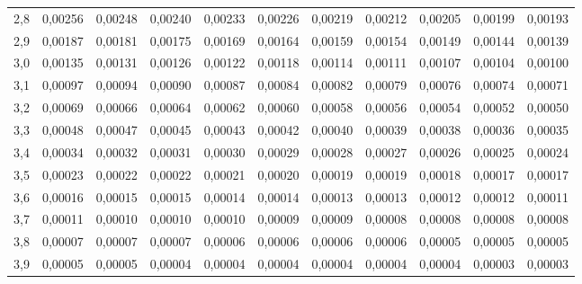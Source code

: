 \documentclass[a4paper]{article}
\begin{document}
\begin{center}
{\begin{tabular}{rrrrrrrrrrr}
  2,8 & 0,00256 & 0,00248 & 0,00240 & 0,00233 & 0,00226 & 0,00219 & 0,00212 & 0,00205 & 0,00199 & 0,00193 \\ 
  2,9 & 0,00187 & 0,00181 & 0,00175 & 0,00169 & 0,00164 & 0,00159 & 0,00154 & 0,00149 & 0,00144 & 0,00139 \\ 
  3,0 & 0,00135 & 0,00131 & 0,00126 & 0,00122 & 0,00118 & 0,00114 & 0,00111 & 0,00107 & 0,00104 & 0,00100 \\ 
  3,1 & 0,00097 & 0,00094 & 0,00090 & 0,00087 & 0,00084 & 0,00082 & 0,00079 & 0,00076 & 0,00074 & 0,00071 \\ 
  3,2 & 0,00069 & 0,00066 & 0,00064 & 0,00062 & 0,00060 & 0,00058 & 0,00056 & 0,00054 & 0,00052 & 0,00050 \\ 
  3,3 & 0,00048 & 0,00047 & 0,00045 & 0,00043 & 0,00042 & 0,00040 & 0,00039 & 0,00038 & 0,00036 & 0,00035 \\ 
  3,4 & 0,00034 & 0,00032 & 0,00031 & 0,00030 & 0,00029 & 0,00028 & 0,00027 & 0,00026 & 0,00025 & 0,00024 \\ 
  3,5 & 0,00023 & 0,00022 & 0,00022 & 0,00021 & 0,00020 & 0,00019 & 0,00019 & 0,00018 & 0,00017 & 0,00017 \\ 
  3,6 & 0,00016 & 0,00015 & 0,00015 & 0,00014 & 0,00014 & 0,00013 & 0,00013 & 0,00012 & 0,00012 & 0,00011 \\ 
  3,7 & 0,00011 & 0,00010 & 0,00010 & 0,00010 & 0,00009 & 0,00009 & 0,00008 & 0,00008 & 0,00008 & 0,00008 \\ 
  3,8 & 0,00007 & 0,00007 & 0,00007 & 0,00006 & 0,00006 & 0,00006 & 0,00006 & 0,00005 & 0,00005 & 0,00005 \\ 
  3,9 & 0,00005 & 0,00005 & 0,00004 & 0,00004 & 0,00004 & 0,00004 & 0,00004 & 0,00004 & 0,00003 & 0,00003 \\ 
   \hline
\end{tabular}}
\end{center}
\end{document}
